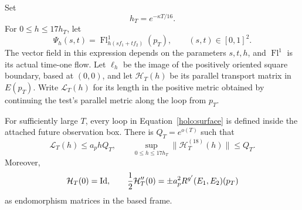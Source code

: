 Set
\begin{equation}\label{holo:h-choice}
 h_T=e^{-\kappa T/16}.
\end{equation}
For $0\leq h\leq17h_T$, let
\begin{equation}\label{holo:surface}
 \Psi_h(s,t)=\operatorname{Fl}^{1}_{h(sf_1+tf_2)}(p_T),
                  \qquad (s,t)\in[0,1]^2.
\end{equation}
The vector field in this expression depends on the parameters
$s,t,h$, and $\operatorname{Fl}^1$ is its actual time-one flow.
Let $\ell_h$ be the image of the positively oriented square
boundary, based at $(0,0)$, and let $\mathcal H_T(h)$ be its
parallel transport matrix in $E(p_T)$.  Write $\mathcal L_T(h)$
for its length in the positive metric obtained by continuing the
test's parallel metric along the loop from $p_T$.

\begin{lemma}
\label{holo:loops}
For sufficiently large $T$, every loop in
Equation~\eqref{holo:surface} is defined inside the attached future
observation box.  There is $Q_T=e^{o(T)}$ such that
\begin{equation}\label{holo:loop-estimates}
 \mathcal L_T(h)\leq a_phQ_T,\qquad
 \sup_{0\leq h\leq17h_T}\|\mathcal H_T^{(18)}(h)\|\leq Q_T.
\end{equation}
Moreover,
\begin{equation}\label{holo:second-coefficient}
 \mathcal H_T(0)=\operatorname{Id},\qquad
 \frac12\mathcal H_T''(0)=\pm a_p^2R^{g'}(E_1,E_2)(p_T)
\end{equation}
as endomorphism matrices in the based frame.
\end{lemma}



